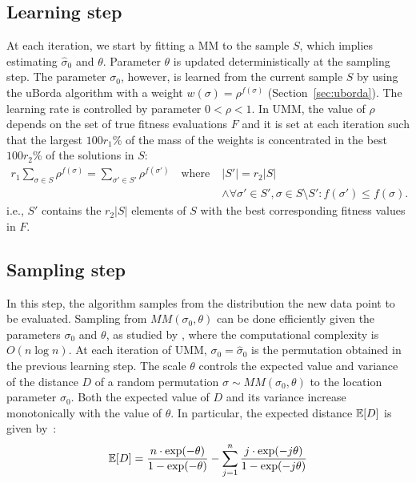 \documentclass[sigconf,dvipsnames]{acmart}
\begin{document}
\subsection{Learning step}
%
At each iteration, we start by fitting a MM to the sample $S$, which implies
estimating $\hat\sigma_0$ and $\theta$. Parameter $\theta$ is updated
deterministically at the sampling step.  The parameter $\sigma_0$, however, is
learned from the current sample $S$ by using the uBorda algorithm with a weight
$w(\sigma)=\rho^{f(\sigma)}$ (Section~\ref{sec:uborda}). The learning rate is
controlled by parameter $0 < \rho < 1$. 
In UMM, the value of $\rho$ depends on the set of true fitness evaluations $F$
and it is set at each iteration such that the largest $100r_1$\% of the mass of
the weights is concentrated in the best $100r_2$\% of the solutions in $S$:
%
%
\begin{equation}
  \begin{split}
  r_1 \sum_{\sigma\in S}\rho^{f(\sigma)} =  \sum_{\sigma'\in S'}\rho^{f(\sigma')} \quad\text{where}\; &|S'| = r_2|S| \\[-1.2em]
  &\land \forall \sigma'\in S', \sigma\in S\setminus S' : f(\sigma')\leq f(\sigma).
  \end{split}
\end{equation}
%
i.e., $S'$ contains the $r_2|S|$ elements of $S$ with the best corresponding fitness values in $F$. %

\subsection{Sampling step}\label{sec:sampling}
In this step, the algorithm samples from the distribution the new data point to be evaluated. 
Sampling from $MM(\sigma_0,\theta)$  can be done efficiently given the parameters  $\sigma_0$ and $\theta$, as studied by \citet{IruCalLoz2016permallows}, where the computational complexity is $O(n\log n)$. %
%
At each iteration of UMM, $\sigma_0=\hat\sigma_0$ is the permutation obtained in the previous learning step. The scale $\theta$ controls the expected value and variance of the distance $D$ of a random permutation $\sigma\sim MM(\sigma_0, \theta)$ to the location parameter $\sigma_0$. Both  the expected value of $D$ and its variance increase monotonically with the value of $\theta$. In particular, the expected distance $\mathbb{E}[D]$ is given by~\cite{FliVer1986}:
%
\begin{equation}\label{eq:expectation}
\mathbb{E}[D] = \frac{n \cdot \exp(-\theta)}{1-\exp(-\theta)} - \sum_{j=1}^{n}  \frac{j\cdot\exp(-j  \theta)}{1-\exp(-j\theta)}
\end{equation}
\end{document}
